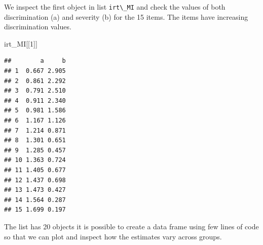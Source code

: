 \documentclass[]{book}
\newenvironment{Shaded}{\begin{snugshade}}{\end{snugshade}}
\newcommand{\CommentTok}[1]{\textcolor[rgb]{0.56,0.35,0.01}{\textit{#1}}}
\newcommand{\ControlFlowTok}[1]{\textcolor[rgb]{0.13,0.29,0.53}{\textbf{#1}}}
\newcommand{\DataTypeTok}[1]{\textcolor[rgb]{0.13,0.29,0.53}{#1}}
\newcommand{\DecValTok}[1]{\textcolor[rgb]{0.00,0.00,0.81}{#1}}
\newcommand{\KeywordTok}[1]{\textcolor[rgb]{0.13,0.29,0.53}{\textbf{#1}}}
\newcommand{\NormalTok}[1]{#1}
\newcommand{\OperatorTok}[1]{\textcolor[rgb]{0.81,0.36,0.00}{\textbf{#1}}}
\newcommand{\StringTok}[1]{\textcolor[rgb]{0.31,0.60,0.02}{#1}}
\begin{document}
\begin{Shaded}
\end{Shaded}

We inspect the first object in list \texttt{irt\textbackslash{}\_MI} and check the values of both discrimination (a) and severity (b) for the 15 items. The items have increasing discrimination values.

\begin{Shaded}
\begin{Highlighting}[]
\NormalTok{irt_MI[[}\DecValTok{1}\NormalTok{]]}
\end{Highlighting}
\end{Shaded}

\begin{verbatim}
##        a     b
## 1  0.667 2.905
## 2  0.861 2.292
## 3  0.791 2.510
## 4  0.911 2.340
## 5  0.981 1.586
## 6  1.167 1.126
## 7  1.214 0.871
## 8  1.301 0.651
## 9  1.285 0.457
## 10 1.363 0.724
## 11 1.405 0.677
## 12 1.437 0.698
## 13 1.473 0.427
## 14 1.564 0.287
## 15 1.699 0.197
\end{verbatim}

The list has 20 objects it is possible to create a data frame using few lines of code so that we can plot and inspect how the estimates vary across groups.
\end{document}
